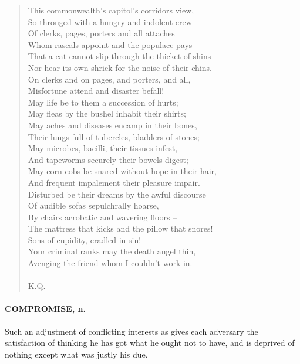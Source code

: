 \documentclass[11pt]{article}
\begin{document}
\begin{quote}   This commonwealth's capitol's corridors view, \\
  So thronged with a hungry and indolent crew \\
  Of clerks, pages, porters and all attaches \\
  Whom rascals appoint and the populace pays \\
  That a cat cannot slip through the thicket of shins \\
  Nor hear its own shriek for the noise of their chins. \\
  On clerks and on pages, and porters, and all, \\
  Misfortune attend and disaster befall! \\
  May life be to them a succession of hurts; \\
  May fleas by the bushel inhabit their shirts; \\
  May aches and diseases encamp in their bones, \\
  Their lungs full of tubercles, bladders of stones; \\
  May microbes, bacilli, their tissues infest, \\
  And tapeworms securely their bowels digest; \\
  May corn-cobs be snared without hope in their hair, \\
  And frequent impalement their pleasure impair. \\
  Disturbed be their dreams by the awful discourse \\
  Of audible sofas sepulchrally hoarse, \\
  By chairs acrobatic and wavering floors -- \\
  The mattress that kicks and the pillow that snores! \\
  Sons of cupidity, cradled in sin! \\
  Your criminal ranks may the death angel thin, \\
  Avenging the friend whom I couldn't work in. \\
 \\
K.Q. \end{quote}


\paragraph{COMPROMISE, n.}  Such an adjustment of conflicting interests as gives
each adversary the satisfaction of thinking he has got what he ought
not to have, and is deprived of nothing except what was justly his
due.
\end{document}
